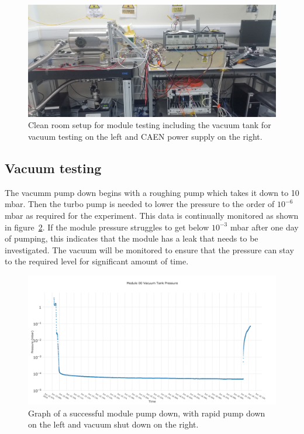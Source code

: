 \begin{figure}[ht]
\centering
\includegraphics[scale=0.4]{Figures/DAQsetup1}
\decoRule
\caption{Clean room setup for module testing including the vacuum tank for vacuum testing on the left and CAEN power supply on the right.}
\label{fig:DAQsetup1}
\end{figure}

\subsection{Vacuum testing}

The vacumm pump down begins with a roughing pump which takes it down to 10 mbar. Then the turbo pump is needed to lower the pressure to the order of $10^{-6}$ mbar as required for the experiment. This data is continually monitored as shown in figure~\ref{fig:vactankpressure}. If the module pressure struggles to get below $10^{-3}$ mbar after one day of pumping, this indicates that the module has a leak that needs to be investigated. The vacuum will be monitored to ensure that the pressure can stay to the required level for significant amount of time.

\begin{figure}[ht]
\centering
\includegraphics[scale=0.4]{Figures/vactankpressure}
\decoRule
\caption{Graph of a successful module pump down, with rapid pump down on the left and vacuum shut down on the right.}
\label{fig:vactankpressure}
\end{figure}

